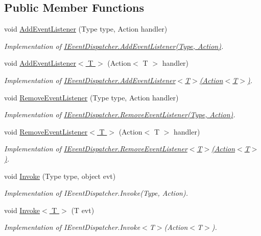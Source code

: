 \subsection*{Public Member Functions}
\begin{DoxyCompactItemize}
\item 
void \hyperlink{class_events_1_1_local_events_aab44ef55c79a59a0b1679207daf32a49}{Add\+Event\+Listener} (Type type, Action handler)
\begin{DoxyCompactList}\small\item\em Implementation of \hyperlink{interface_events_1_1_i_event_dispatcher_ac22d58973ca79fdaea1471704dba0e01}{I\+Event\+Dispatcher.\+Add\+Event\+Listener(\+Type, Action)}. \end{DoxyCompactList}\item 
void \hyperlink{class_events_1_1_local_events_add06ea2d4511cbf585df741b09d54742}{Add\+Event\+Listener$<$ T $>$} (Action$<$ T $>$ handler)
\begin{DoxyCompactList}\small\item\em Implementation of \hyperlink{interface_events_1_1_i_event_dispatcher_a4c10e52a26a0c354bcaae21e0a240f93}{I\+Event\+Dispatcher.\+Add\+Event\+Listener$<$\+T$>$(\+Action$<$\+T$>$)}. \end{DoxyCompactList}\item 
void \hyperlink{class_events_1_1_local_events_acff4973a06ab3ce4bd0a2c8adbe54e2b}{Remove\+Event\+Listener} (Type type, Action handler)
\begin{DoxyCompactList}\small\item\em Implementation of \hyperlink{interface_events_1_1_i_event_dispatcher_ae3209681ebdbcf8289905ff6ccdbd188}{I\+Event\+Dispatcher.\+Remove\+Event\+Listener(\+Type, Action)}. \end{DoxyCompactList}\item 
void \hyperlink{class_events_1_1_local_events_ac8647cb9efdd5e6b86362908a8019cad}{Remove\+Event\+Listener$<$ T $>$} (Action$<$ T $>$ handler)
\begin{DoxyCompactList}\small\item\em Implementation of \hyperlink{interface_events_1_1_i_event_dispatcher_a86e3438c779746108c3f01dff0c43d23}{I\+Event\+Dispatcher.\+Remove\+Event\+Listener$<$\+T$>$(\+Action$<$\+T$>$)}. \end{DoxyCompactList}\item 
void \hyperlink{class_events_1_1_local_events_a4464675f72b8e310902f22770f4be0f4}{Invoke} (Type type, object evt)
\begin{DoxyCompactList}\small\item\em Implementation of I\+Event\+Dispatcher.\+Invoke(\+Type, Action). \end{DoxyCompactList}\item 
void \hyperlink{class_events_1_1_local_events_a1e67a61a570a8105c018c366b54959c6}{Invoke$<$ T $>$} (T evt)
\begin{DoxyCompactList}\small\item\em Implementation of I\+Event\+Dispatcher.\+Invoke$<$\+T$>$(\+Action$<$\+T$>$). \end{DoxyCompactList}\end{DoxyCompactItemize}


